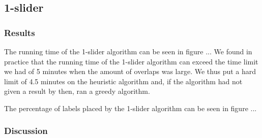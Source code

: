 \documentclass[crop=false,a4paper,oneside,11pt]{standalone}
\begin{document}
\subsection{1-slider}
\subsubsection{Results}
The running time of the 1-slider algorithm can be seen in figure ... We found in practice that the running time of the 1-slider algorithm can exceed the time limit we had of 5 minutes when the amount of overlaps was large. We thus put a hard limit of 4.5 minutes on the heuristic algorithm and, if the algorithm had not given a result by then, ran a greedy algorithm.

The percentage of labels placed by the 1-slider algorithm can be seen in figure ...
\subsubsection{Discussion}
\end{document}
